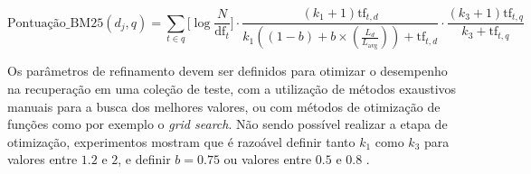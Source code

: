         \begin{equation}
            \label{eq:okapi-bm25-tf-consulta}
    		\text{Pontuação\_BM25}(d_j, q) = 
    		\sum_{t \in q} 
    		\Bigg[ \log{\frac{N}{\text{df}_{t}}} \Bigg]
    		\cdot 
    		\frac{(k_1 + 1) \text{tf}_{t,d}}{k_1((1-b)+b \times (\frac{L_d}{L_{\text{avg}}})) + \text{tf}_{t,d}} \cdot 
    		\frac{(k_3+1) \text{tf}_{t,q}}{k_3 + \text{tf}_{t,q}}
        \end{equation}
        
        Os parâmetros de refinamento devem ser definidos para otimizar o desempenho na recuperação em uma coleção de teste, com a utilização de métodos exaustivos manuais para a busca dos melhores valores, ou com métodos de otimização de funções como por exemplo o \textit{grid search}. 
        Não sendo possível realizar a etapa de otimização, experimentos mostram que é razoável definir tanto $k_1$ como $k_3$ para valores entre $1.2$ e $2$, e definir $b = 0.75$ ou valores entre $0.5$ e $0.8$ \cite[p.~215]{Manning2008IIR} \cite[p.~360--361]{robertson_probabilistic_2010}.
        
